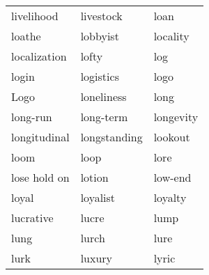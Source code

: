 \documentclass{minimal}
\begin{document}
\begin{longtable}{p{2.7cm}@{\hskip 0.2cm}p{2.7cm}@{\hskip 0.2cm}p{2.7cm}}
livelihood & livestock & loan \\
loathe & lobbyist & locality \\
localization & lofty & log \\
login & logistics & logo \\
Logo & loneliness & long \\
long-run & long-term & longevity \\
longitudinal & longstanding & lookout \\
loom & loop & lore \\
lose hold on & lotion & low-end \\
loyal & loyalist & loyalty \\
lucrative & lucre & lump \\
lung & lurch & lure \\
lurk & luxury & lyric
\end{longtable}
\end{document}
